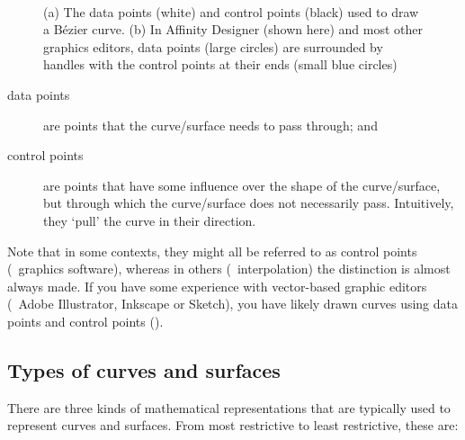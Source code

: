 \begin{figure}
\begin{subfigure}{0.3\linewidth}
\caption{}%
\label{subfig:pointtypesb}
\end{subfigure}\\
\caption{(a) The data points (white) and control points (black) used to draw a B\'ezier curve.
(b) In Affinity Designer (shown here) and most other graphics editors, data points (large circles) are surrounded by handles with the control points at their ends (small blue circles)}%
\label{fig:pointtypes}
\end{figure}

\begin{description}
\item[data points] are points that the curve/surface needs to pass through; and
\item[control points] are points that have some influence over the shape of the curve/surface, but through which the curve/surface does not necessarily pass. Intuitively, they `pull' the curve in their direction.
\end{description}

Note that in some contexts, they might all be referred to as control points (\eg\ graphics software), whereas in others (\eg\ interpolation) the distinction is almost always made.
If you have some experience with vector-based graphic editors (\eg\ Adobe Illustrator, Inkscape or Sketch), you have likely drawn curves using data points and control points ().

\subsection{Types of curves and surfaces}

There are three kinds of mathematical representations that are typically used to represent curves and surfaces.
From most restrictive to least restrictive, these are:

